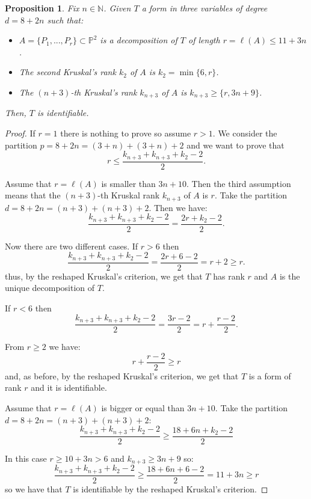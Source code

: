 \documentclass[a4paper,10pt,oneside]{article}
\theoremstyle{casep}
\newcommand{\Pj}{\mathbb{P}}
\newcommand{\N}{\mathbb{N}}
\newtheorem{proposition}[theorem]{Proposition}
\theoremstyle{definition}
\begin{document}
\begin{proposition}
Fix $ n \in \N $. Given $T$ a form in three variables of degree $d=8+2n$ such that:

\begin{itemize}
	\item[1)]$A=\{P_1,...,P_r\}\subset\Pj^2$ is a decomposition of $ T $ of length $r=\ell(A)\leq 11+3n$.
	\item[2)] The second Kruskal's rank $ k_2 $ of $A$ is $k_2=\min\{6,r\}$.
	\item[3)] The $(n+3)$-th Kruskal's rank $k_{n+3}$ of $A$ is $k_{n+3} \geq \{r,3n+9\}$.
\end{itemize} 

Then, $T$ is identifiable.
\label{proposition:1}
\end{proposition}
\begin{proof} If $r=1$ there is nothing to prove so assume $r>1$.
We consider the partition $p= 8 +2n =(3+n)+(3+n)+2 $ and we want to prove that $$r \leq \frac{k_{n+3}+k_{n+3}+k_2 -2 }2.$$


Assume that $r=\ell(A)$ is smaller than $3n+10$. Then the third assumption means that the $(n+3)$-th Kruskal rank $k_{n+3}$ of $A$ is $r$. 
Take the partition $d=8+2n=(n+3)+(n+3)+2$. Then we have:
$$\frac {k_{n+3}+k_{n+3}+k_2 -2 }2 = \frac {2r+k_2 -2} 2.$$

Now there are two different cases. If $r>6$ then $$\frac {k_{n+3}+k_{n+3}+k_2 -2 }2 = \frac {2r+6 -2} 2 = r +2 \geq r.$$
thus, by the reshaped Kruskal's criterion, we get that $T$ has rank $r$ and $A$ is the unique decomposition
of $T$.

If $r<6$ then $$\frac {k_{n+3}+k_{n+3}+k_2 -2 }2 = \frac {3r -2} 2 = r + \frac {r -2} 2.$$ 

From $r \geq 2$ we have: $$r + \frac {r -2} 2 \geq r $$
and, as before, by the reshaped Kruskal's criterion, we get that $T$ is a form of rank $r$ and it is identifiable.

 Assume that $r=\ell(A)$ is bigger or equal than $3n+10$. Take the partition $d=8+2n=(n+3)+(n+3)+2$:
 $$ \frac{k_{n+3}+k_{n+3}+k_2-2}{2} \geq \frac{18+6n+k_2-2}{2} $$
 
 In this case $ r \geq 10+3n >6$ and $k_{n+3} \geq 3n+9$ so:
$$\frac {k_{n+3}+k_{n+3}+k_2 -2 }2 \geq \frac {18+6n+6 -2} 2 = 11+3n \geq r$$ so we have that $T$ is identifiable by the reshaped Kruskal's criterion.



\end{proof}
\end{document}
